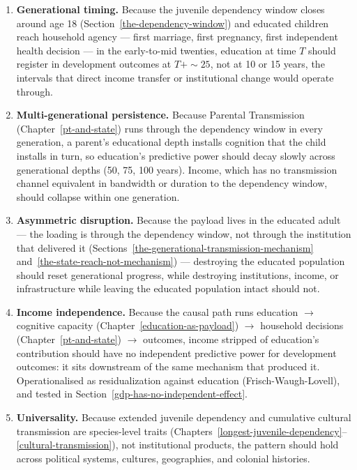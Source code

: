 \documentclass[12pt,letterpaper]{article}
\begin{document}
\begin{enumerate}
\item \textbf{Generational timing.} Because the juvenile dependency
window closes around age 18 (Section~\ref{the-dependency-window}) and
educated children reach household agency --- first marriage, first
pregnancy, first independent health decision --- in the early-to-mid
twenties, education at time $T$ should register in development outcomes
at $T+{\sim}25$, not at 10 or 15 years, the intervals that direct income
transfer or institutional change would operate through.\label{pred:timing}

\item \textbf{Multi-generational persistence.} Because Parental
Transmission (Chapter~\ref{pt-and-state}) runs through the dependency
window in every generation, a parent's educational depth installs
cognition that the child installs in turn, so education's predictive
power should decay slowly across generational depths (50, 75, 100
years). Income, which has no transmission channel equivalent in
bandwidth or duration to the dependency window, should collapse within
one generation.\label{pred:persistence}

\item \textbf{Asymmetric disruption.} Because the payload lives in the
educated adult --- the loading is through the dependency window, not
through the institution that delivered it
(Sections~\ref{the-generational-transmission-mechanism}
and~\ref{the-state-reach-not-mechanism}) --- destroying the educated
population should reset generational progress, while destroying
institutions, income, or infrastructure while leaving the educated
population intact should not.\label{pred:disruption}

\item \textbf{Income independence.} Because the causal path runs
education $\to$ cognitive capacity (Chapter~\ref{education-as-payload})
$\to$ household decisions (Chapter~\ref{pt-and-state}) $\to$ outcomes,
income stripped of education's contribution should have no independent
predictive power for development outcomes: it sits downstream of the
same mechanism that produced it. Operationalised as residualization
against education (Frisch-Waugh-Lovell), and tested in
Section~\ref{gdp-has-no-independent-effect}.\label{pred:income}

\item \textbf{Universality.} Because extended juvenile dependency and
cumulative cultural transmission are species-level traits
(Chapters~\ref{longest-juvenile-dependency}--\ref{cultural-transmission}),
not institutional products, the pattern should hold across political
systems, cultures, geographies, and colonial histories.\label{pred:universality}


\end{enumerate}
\end{document}
